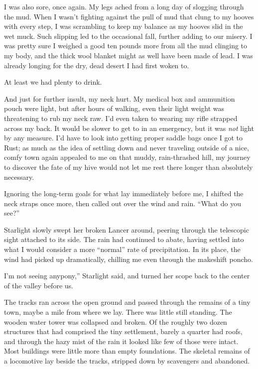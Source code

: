 I was also sore, once again. My legs ached from a long day of slogging through the mud. When I wasn’t fighting against the pull of mud that clung to my hooves with every step, I was scrambling to keep my balance as my hooves slid in the wet muck. Such slipping led to the occasional fall, further adding to our misery. I was pretty sure I weighed a good ten pounds more from all the mud clinging to my body, and the thick wool blanket might as well have been made of lead. I was already longing for the dry, dead desert I had first woken to.

At least we had plenty to drink.

And just for further insult, my neck hurt. My medical box and ammunition pouch were light, but after hours of walking, even their light weight was threatening to rub my neck raw. I’d even taken to wearing my rifle strapped across my back. It would be slower to get to in an emergency, but it was \textit{not} light by any measure. I’d have to look into getting proper saddle bags once I got to Rust; as much as the idea of settling down and never traveling outside of a nice, comfy town again appealed to me on that muddy, rain-thrashed hill, my journey to discover the fate of my hive would not let me rest there longer than absolutely necessary.

Ignoring the long-term goals for what lay immediately before me, I shifted the neck straps once more, then called out over the wind and rain. “What do you see?”

Starlight slowly swept her broken Lancer around, peering through the telescopic sight attached to its side. The rain had continued to abate, having settled into what I would consider a more “normal” rate of precipitation. In its place, the wind had picked up dramatically, chilling me even through the makeshift poncho.

\leavevmode{}I’m not seeing anypony,” Starlight said, and turned her scope back to the center of the valley before us.

The tracks ran across the open ground and passed through the remains of a tiny town, maybe a mile from where we lay. There was little still standing. The wooden water tower was collapsed and broken. Of the roughly two dozen structures that had comprised the tiny settlement, barely a quarter had roofs, and through the hazy mist of the rain it looked like few of those were intact. Most buildings were little more than empty foundations. The skeletal remains of a locomotive lay beside the tracks, stripped down by scavengers and abandoned.

